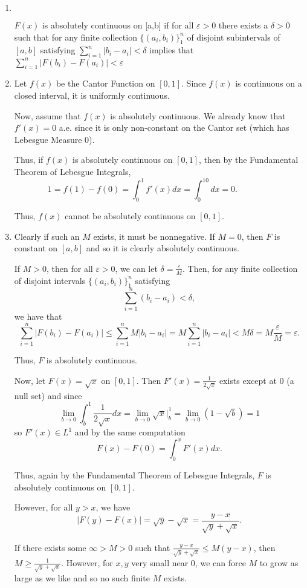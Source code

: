\documentclass[12pt]{Qual}
\begin{document}
\begin{solution}$\,$
\begin{enumerate}[label=(\alph*)]
    \item $\,$

    \begin{framed}[.75\textwidth]
    $F(x)$ is absolutely continuous on [a,b] if for all $\varepsilon>0$ there exists a $\delta>0$ such that for any finite collection $\{(a_i,b_i)\}_1^n$ of disjoint subintervals of $[a,b]$ satisfying $\displaystyle\sum_{i=1}^n|b_i-a_i|<\delta$ implies that $\displaystyle\sum_{i=1}^n|F(b_i)-F(a_i)|<\varepsilon$
    \end{framed}
    \item Let $f(x)$ be the Cantor Function on $[0,1]$. Since $f(x)$ is continuous on a closed interval, it is uniformly continuous.

    Now, assume that $f(x)$ is absolutely continuous. We already know that $f'(x)=0$ a.e. since it is only non-constant on the Cantor set (which has Lebesgue Measure $0$).

    Thus, if $f(x)$ is absolutely continuous on $[0,1]$, then by the Fundamental Theorem of Lebesgue Integrals, $$1=f(1)-f(0)=\int_0^1f'(x)dx=\int_0^10dx=0.\qquad\qquad$$

    Thus, $f(x)$ cannot be absolutely continuous on $[0,1]$.
    \item Clearly if such an $M$ exists, it must be nonnegative. If $M=0$, then $F$ is constant on $[a,b]$ and so it is clearly absolutely continuous.

    If $M>0$, then for all $\varepsilon>0$, we can let $\delta=\frac{\varepsilon}{M}$. Then, for any finite collection of disjoint intervals $\{(a_i,b_i)\}_1^n$ satisfying $$\sum_{i=1}^n(b_i-a_i)<\delta,$$ we have that $$\sum_{i=1}^n|F(b_i)-F(a_i)|\le\sum_{i=1}^nM|b_i-a_i|=M\sum_{i=1}^n|b_i-a_i|<M\delta=M\frac{\varepsilon}{M}=\varepsilon.$$

    Thus, $F$ is absolutely continuous.

    Now, let $F(x)=\sqrt{x}$ on $[0,1]$. Then $F'(x)=\frac{1}{2\sqrt{x}}$ exists except at $0$ (a null set) and since $$\lim_{b\to0}\int_b^1\frac{1}{2\sqrt{x}}dx=\lim_{b\to0}\sqrt{x}\bigg|_b^1=\lim_{b\to0}(1-\sqrt{b})=1$$ so $F'(x)\in L^1$ and by the same computation $$F(x)-F(0)=\int_0^xF'(x)dx.$$

    Thus, again by the Fundamental Theorem of Lebesgue Integrals, $F$ is absolutely continuous on $[0,1]$.

    However, for all $y>x$, we have $$|F(y)-F(x)|=\sqrt{y}-\sqrt{x}=\frac{y-x}{\sqrt{y}+\sqrt{x}}.$$

    If there exists some $\infty>M>0$ such that $\frac{y-x}{\sqrt{y}+\sqrt{x}}\le M(y-x)$, then $M\ge\frac{1}{\sqrt{y}+\sqrt{x}}.$ However, for $x,y$ very small near $0$, we can force $M$ to grow as large as we like and so no such finite $M$ exists.
\end{enumerate}
\end{solution}
\vspace{0.5cm}
\end{document}
